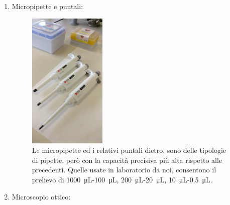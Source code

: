 \documentclass{article}
\begin{document}
\begin{enumerate}
\begin{figure}[H]
		\end{figure}

		\vspace{0.5cm}


		\item Micropipette e puntali:

		\begin{figure}[H]

			\includegraphics[width=0.35\textwidth]{./immagini/micropipette.jpg}
			\caption{Le micropipette ed i relativi puntali dietro, sono delle tipologie di pipette, però con la capacità precisiva più alta rispetto alle precedenti. Quelle usate in laboratorio da noi, consentono il prelievo di
			\SI{1000}{\micro\liter}-\SI{100}{\micro\liter}, \SI{200}{\micro\liter}-\SI{20}{\micro\liter},
			\SI{10}{\micro\liter}-\SI{0.5}{\micro\liter}. }
			\label{micropipette}

		\end{figure}

		\vspace{0.5cm}


		\item Microscopio ottico:

		\begin{figure}[H]


\end{figure}
\end{enumerate}
\end{document}
